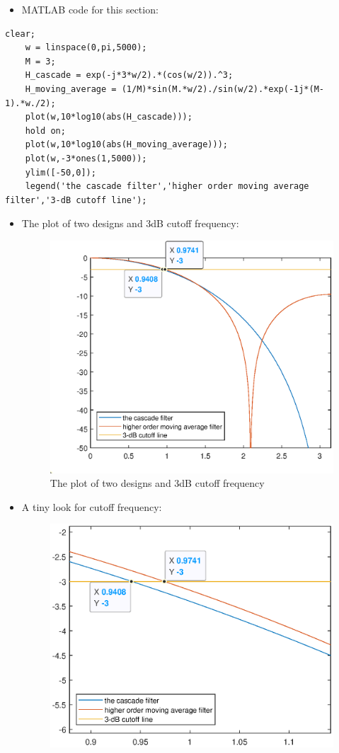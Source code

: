 \documentclass[onecolumn,oneside]{SUSTechHomework}
\begin{document}
\begin{itemize}
    \item MATLAB code for this section:
\end{itemize}
\begin{lstlisting}[title=\textbf{q6\_3\_2.m}]
    clear;
    w = linspace(0,pi,5000);
    M = 3;
    H_cascade = exp(-j*3*w/2).*(cos(w/2)).^3;
    H_moving_average = (1/M)*sin(M.*w/2)./sin(w/2).*exp(-1j*(M-1).*w./2);
    plot(w,10*log10(abs(H_cascade)));
    hold on;
    plot(w,10*log10(abs(H_moving_average)));
    plot(w,-3*ones(1,5000));
    ylim([-50,0]);
    legend('the cascade filter','higher order moving average filter','3-dB cutoff line');
\end{lstlisting}
\begin{itemize}
    \item The plot of two designs and 3dB cutoff frequency:
    \begin{figure}[H]
    \centering
    \includegraphics[width=140mm]{pictures/twodesigns1.eps}
    \caption{The plot of two designs and 3dB cutoff frequency}
    \end{figure}
    \item A tiny look for cutoff frequency:
    \begin{figure}[H]
    \centering
    \includegraphics[width=140mm]{pictures/twodesigns2.eps}

\end{figure}
\end{itemize}
\end{document}
